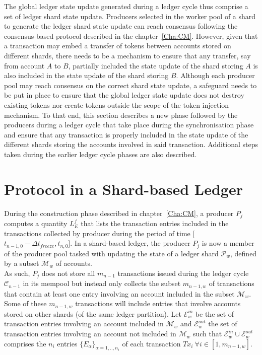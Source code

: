 The global ledger state update generated during a ledger cycle thus comprise a set of ledger shard state update. Producers selected in the worker pool of a shard to generate the ledger shard state update can reach consensus following the consensus-based protocol described in the chapter~\ref{Cha:CM}. However, given that a transaction may embed a transfer of tokens between accounts stored on different shards, there needs to be a mechanism to ensure that any transfer, say from account $A$ to $B$, partially included the state update of the shard storing $A$ is also included in the state update of the shard storing $B$. Although each producer pool may reach consensus on the correct shard state update, a safeguard needs to be put in place to ensure that the global ledger state update does not destroy existing tokens nor create tokens outside the scope of the token injection mechanism. To that end, this section describes a new phase followed by the producers during a ledger cycle that take place during the synchronisation phase and ensure that any transaction is properly included in the state update of the different shards storing the accounts involved in said transaction.  Additional steps taken during the earlier ledger cycle phases are also described.

\section{Protocol in a Shard-based Ledger}

During the construction phase described in chapter~\ref{Cha:CM}, a producer $P_j$ computes a quantity $L_E^f$ that lists the transaction entries included in the transactions collected by producer during the period of time [$t_{n-1,0} - \Delta t_{freeze}, t_{n,0}$]. In a shard-based ledger, the producer $P_j$ is now a member of the producer pool tasked with updating the state of a ledger shard $\mathcal{P}_w$, defined by a subset $\mathcal{M}_w$ of accounts.\\

As such, $P_j$ does not store all $m_{n-1}$ transactions issued during the ledger cycle $\mathcal{C}_{n-1}$ in its mempool but instead only collects the subset $m_{n-1,w}$ of transactions that contain at least one entry involving  an account included in the subset $\mathcal{M}_w$.\\

Some of these $m_{n-1,w}$ transactions will include entries that involve accounts stored on other shards (of the same ledger partition). Let $\mathcal{E}^{in}_w$ be the set of transaction entries involving an account included in $\mathcal{M}_w$ and $\mathcal{E}^{out}_w$ the set of transaction entries involving an account not included in $\mathcal{M}_w$ such that $\mathcal{E}^{in}_w \cup \mathcal{E}^{out}_w$ comprises the $n_i$ entries $\{E_\alpha\}_{\alpha=1,..,n_i}$ of each transaction $Tx_i~\forall i \in  [1, m_{n-1,w}]$.\\

